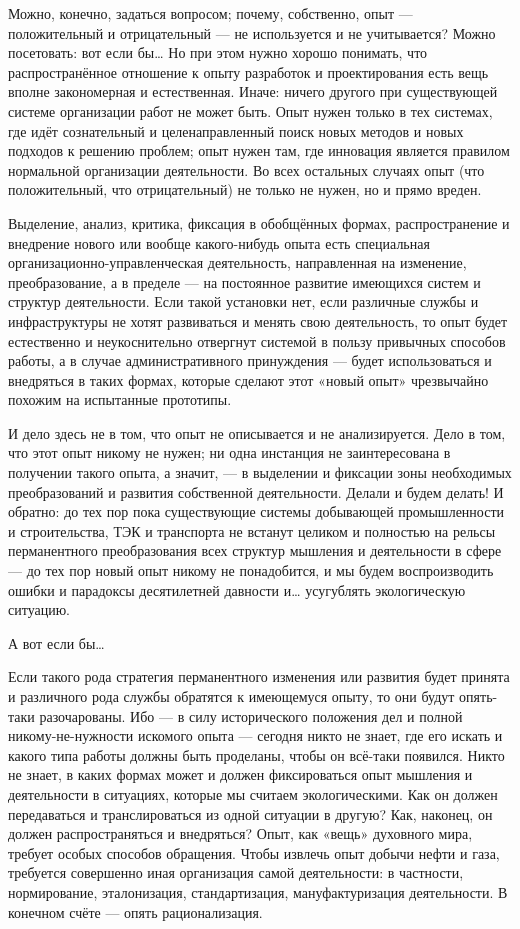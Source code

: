\documentclass[11pt,a4paper]{article}
\begin{document}
Можно, конечно, задаться вопросом; почему, собственно, опыт — положительный и
отрицательный — не используется и не учитывается? Можно посетовать: вот если
бы… Но при этом нужно хорошо понимать, что распространённое отношение к опыту
разработок и проектирования есть вещь вполне закономерная и
естественная. Иначе: ничего другого при существующей системе организации работ
не может быть. Опыт нужен только в тех системах, где идёт сознательный и
целенаправленный поиск новых методов и новых подходов к решению проблем; опыт
нужен там, где инновация является правилом нормальной организации
деятельности. Во всех остальных случаях опыт (что положительный, что
отрицательный) не только не нужен, но и прямо вреден. 

Выделение, анализ, критика, фиксация в обобщённых формах, распространение и
внедрение нового или вообще какого-нибудь опыта есть специальная
организационно-управ\-ленческая деятельность, направленная на изменение,
преобразование, а в пределе — на постоянное развитие имеющихся систем и
структур деятельности. Если такой установки нет, если различные службы и
инфраструктуры не хотят развиваться и менять свою деятельность, то опыт будет
естественно и неукоснительно отвергнут системой в пользу привычных способов
работы, а в случае административного принуждения — будет использоваться и
внедряться в таких формах, которые сделают этот «новый опыт» чрезвычайно
похожим на испытанные прототипы. 

И дело здесь не в том, что опыт не описывается и не анализируется. Дело в том,
что этот опыт никому не нужен; ни одна инстанция не заинтересована в получении
такого опыта, а значит, — в выделении и фиксации зоны необходимых
преобразований и развития собственной деятельности. Делали и будем делать! И
обратно: до тех пор пока существующие системы добывающей промышленности и
строительства, ТЭК и транспорта не встанут целиком и полностью на рельсы
перманентного преобразования всех структур мышления и деятельности в сфере —
до тех пор новый опыт никому не понадобится, и мы будем воспроизводить ошибки
и парадоксы десятилетней давности и… усугублять экологическую ситуацию. 

А вот если бы…

Если такого рода стратегия перманентного изменения или развития будет принята
и различного рода службы обратятся к имеющемуся опыту, то они будут опять-таки
разочарованы. Ибо — в силу исторического положения дел и полной
никому-не-нужности искомого опыта — сегодня никто не знает, где его искать и
какого типа работы должны быть проделаны, чтобы он всё-таки появился. Никто не
знает, в каких формах может и должен фиксироваться опыт мышления и
деятельности в ситуациях, которые мы считаем экологическими. Как он должен
передаваться и транслироваться из одной ситуации в другую? Как, наконец, он
должен распространяться и внедряться? Опыт, как «вещь» духовного мира, требует
особых способов обращения. Чтобы извлечь опыт добычи нефти и газа, требуется
совершенно иная организация самой деятельности: в частности, нормирование,
эталонизация, стандартизация, мануфактуризация деятельности. В конечном счёте
— опять рационализация. 
\end{document}
